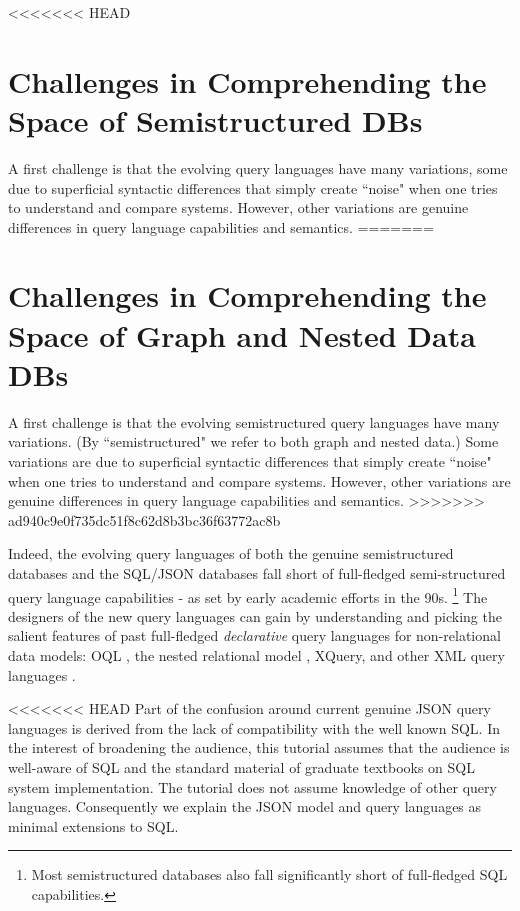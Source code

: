 
<<<<<<< HEAD
\section{Challenges in Comprehending the Space of Semistructured DBs}
A first challenge is that the evolving query languages have many variations, some due to superficial syntactic differences that simply create ``noise" when one tries to understand and compare systems. However, other variations are genuine differences in query language capabilities and semantics.
=======
\section{Challenges in Comprehending the Space of Graph and Nested Data DBs}
A first challenge is that the evolving semistructured query languages have many variations. (By ``semistructured" we refer to both graph and nested data.) Some variations are due to superficial syntactic differences that simply create ``noise" when one tries to understand and compare systems. However, other variations are genuine differences in query language capabilities and semantics.
>>>>>>> ad940c9e0f735dc51f8c62d8b3bc36f63772ac8b

Indeed, the evolving query languages of both the genuine semistructured databases and the SQL/JSON databases fall short of full-fledged semi-structured query language capabilities - as set by early academic efforts in the 90s.%
\footnote{Most semistructured databases also fall significantly short of full-fledged SQL capabilities.}
The designers of the new query languages can gain by understanding and picking the salient features of past full-fledged \textit{declarative} query languages for non-relational data models: OQL \cite{oql-dbpl-1989}, the nested relational model \cite{nest-unnest-pods-1982,nested-relational-vldb-1988,nested-relational-workshop-lncs-1989}, 
XQuery, and other XML query languages \cite{xquery-3.0-w3c-2013,xml-ql-computer-networks-1999,xml-query-language-survey-sigmod-record-2000}.

<<<<<<< HEAD
Part of the confusion around current genuine JSON query languages is derived from the lack of compatibility with the well known SQL. In the interest of broadening the audience, this tutorial assumes that the audience is well-aware of SQL and the standard material of graduate textbooks on SQL system implementation. The tutorial does not assume knowledge of other query languages. Consequently we explain the JSON model and query languages as minimal extensions to SQL.

